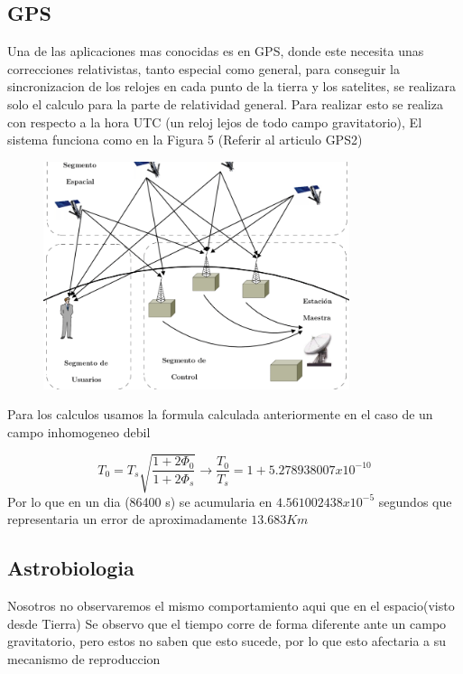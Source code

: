 \documentclass[12pt,twoside]{rif}
\begin{document}
	\subsection{GPS}
	Una de las aplicaciones mas conocidas es en GPS, donde este necesita unas correcciones relativistas, tanto especial como general, para conseguir la sincronizacion de los relojes en cada punto de la tierra y los satelites, se realizara solo el calculo para la parte de relatividad general. Para realizar esto se realiza con respecto a la hora UTC (un reloj lejos de todo campo gravitatorio), El sistema funciona como en la Figura 5
(Referir al articulo GPS2)
	\begin{center}
	\begin{figure}
	\includegraphics[width=0.8\textwidth]{img/GPS.png}
	\end{figure}
	\end{center}
	
Para los calculos usamos la formula calculada anteriormente en el caso de un campo inhomogeneo debil

\begin{equation}
T_{0}=T_{s}\sqrt{\frac{1+2\Phi_{0}}{1+2\Phi_{s}}}\to
\frac{T_{0}}{T_{s}}=1+5.278938007 x 10^{-10}
\end{equation}
Por lo que en un dia (86400 s) se acumularia en $4.561002438x10^{-5}$ segundos que representaria un error de aproximadamente $13.683 Km$

	\subsection{Astrobiologia}
	Nosotros no observaremos el mismo comportamiento aqui que en  el espacio(visto desde Tierra) Se observo que el tiempo corre de forma diferente ante un campo gravitatorio, pero estos no saben que esto sucede, por lo que esto afectaria a su mecanismo de reproduccion
\end{document}
